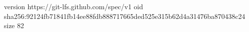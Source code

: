 version https://git-lfs.github.com/spec/v1
oid sha256:92124fb71841fb14ee88fdb888717665ded525e315b62d4a31476ba870438c24
size 82
